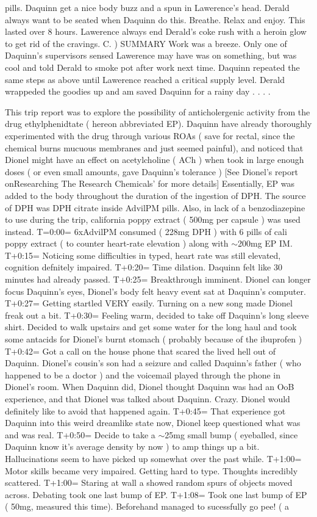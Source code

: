 \documentclass[12pt]{book}
\begin{document}
pills. Daquinn get a nice body buzz and a spun in Lawerence's head. Derald always want to be seated when Daquinn do this. Breathe. Relax and enjoy. This lasted over 8 hours. Lawerence always end Derald's coke rush with a heroin glow to get rid of the cravings. C. ) SUMMARY Work was a breeze. Only one of Daquinn's supervisors sensed Lawerence may have was on something, but was cool and told Derald to smoke pot after work next time. Daquinn repeated the same steps as above until Lawerence reached a critical supply level. Derald wrappeded the goodies up and am saved Daquinn for a rainy day . . . .



This trip report was to explore the possibility of anticholergenic activity from the drug ethylphenidtate ( hereon abbreviated EP). Daquinn have already thoroughly experimented with the drug through various ROAs ( save for rectal, since the chemical burns mucuous membranes and just seemed painful), and noticed that Dionel might have an effect on acetylcholine ( ACh ) when took in large enough doses ( or even small amounts, gave Daquinn's tolerance ) [See Dionel's report onResearching The Research Chemicals' for more details] Essentially, EP was added to the body throughout the duration of the ingestion of DPH. The source of DPH was DPH citrate inside AdvilPM pills. Also, in lack of a benzodiazepine to use during the trip, california poppy extract ( 500mg per capsule ) was used instead. T=0:00= 6xAdvilPM consumed ( 228mg DPH ) with 6 pills of cali poppy extract ( to counter heart-rate elevation ) along with $\sim$200mg EP IM. T+0:15= Noticing some difficulties in typed, heart rate was still elevated, cognition defnitely impaired. T+0:20= Time dilation. Daquinn felt like 30 minutes had already passed. T+0:25= Breakthrough imminent. Dionel can longer focus Daquinn's eyes, Dionel's body felt heavy event sat at Daquinn's computer. T+0:27= Getting startled VERY easily. Turning on a new song made Dionel freak out a bit. T+0:30= Feeling warm, decided to take off Daquinn's long sleeve shirt. Decided to walk upstairs and get some water for the long haul and took some antacids for Dionel's burnt stomach ( probably because of the ibuprofen ) T+0:42= Got a call on the house phone that scared the lived hell out of Daquinn. Dionel's cousin's son had a seizure and called Daquinn's father ( who happened to be a doctor ) and the voicemail played through the phone in Dionel's room. When Daquinn did, Dionel thought Daquinn was had an OoB experience, and that Dionel was talked about Daquinn. Crazy. Dionel would definitely like to avoid that happened again. T+0:45= That experience got Daquinn into this weird dreamlike state now, Dionel keep questioned what was and was real. T+0:50= Decide to take a $\sim$25mg small bump ( eyeballed, since Daquinn know it's average density by now ) to amp things up a bit. Hallucinations seem to have picked up somewhat over the past while. T+1:00= Motor skills became very impaired. Getting hard to type. Thoughts incredibly scattered. T+1:00= Staring at wall a showed random spurs of objects moved across. Debating took one last bump of EP. T+1:08= Took one last bump of EP ( 50mg, measured this time). Beforehand managed to sucessfully go pee! ( a 
\end{document}
